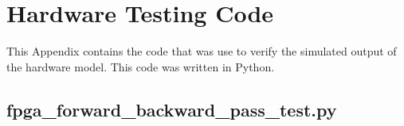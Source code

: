 \chapter{Hardware Testing Code}\label{app:hw-test}
This Appendix contains the code that was use to verify the simulated output of the hardware model. This code was written in Python.

\section{fpga\_forward\_backward\_pass\_test.py}

\pagebreak